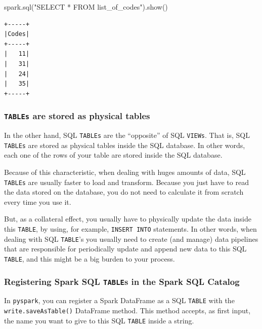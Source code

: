 \documentclass[
  11pt,
  letterpaper,
  DIV=11,
  numbers=noendperiod]{scrreprt}
\newenvironment{Shaded}{\begin{snugshade}}{\end{snugshade}}
\newcommand{\NormalTok}[1]{\textcolor[rgb]{0.00,0.23,0.31}{#1}}
\newcommand{\StringTok}[1]{\textcolor[rgb]{0.13,0.47,0.30}{#1}}
\begin{document}
\begin{Shaded}
\begin{Highlighting}[]
\NormalTok{spark.sql(}\StringTok{"SELECT * FROM list\_of\_codes"}\NormalTok{).show()}
\end{Highlighting}
\end{Shaded}

\begin{verbatim}
+-----+
|Codes|
+-----+
|   11|
|   31|
|   24|
|   35|
+-----+
\end{verbatim}

\hypertarget{tables-are-stored-as-physical-tables}{%
\subsubsection{\texorpdfstring{\texttt{TABLEs} are stored as physical
tables}{TABLEs are stored as physical tables}}\label{tables-are-stored-as-physical-tables}}

In the other hand, SQL \texttt{TABLEs} are the ``opposite'' of SQL
\texttt{VIEWs}. That is, SQL \texttt{TABLEs} are stored as physical
tables inside the SQL database. In other words, each one of the rows of
your table are stored inside the SQL database.

Because of this characteristic, when dealing with huges amounts of data,
SQL \texttt{TABLEs} are usually faster to load and transform. Because
you just have to read the data stored on the database, you do not need
to calculate it from scratch every time you use it.

But, as a collateral effect, you usually have to physically update the
data inside this \texttt{TABLE}, by using, for example,
\texttt{INSERT\ INTO} statements. In other words, when dealing with SQL
\texttt{TABLE}'s you usually need to create (and manage) data pipelines
that are responsible for periodically update and append new data to this
SQL \texttt{TABLE}, and this might be a big burden to your process.

\hypertarget{registering-spark-sql-tables-in-the-spark-sql-catalog}{%
\subsubsection{\texorpdfstring{Registering Spark SQL \texttt{TABLE}s in
the Spark SQL
Catalog}{Registering Spark SQL TABLEs in the Spark SQL Catalog}}\label{registering-spark-sql-tables-in-the-spark-sql-catalog}}

In \texttt{pyspark}, you can register a Spark DataFrame as a SQL
\texttt{TABLE} with the \texttt{write.saveAsTable()} DataFrame method.
This method accepts, as first input, the name you want to give to this
SQL \texttt{TABLE} inside a string.
\end{document}
